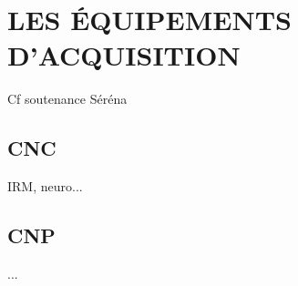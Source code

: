 \chapter{LES ÉQUIPEMENTS D'ACQUISITION}
Cf soutenance Séréna\par

\section{CNC}
IRM, neuro...
\section{CNP}
...
